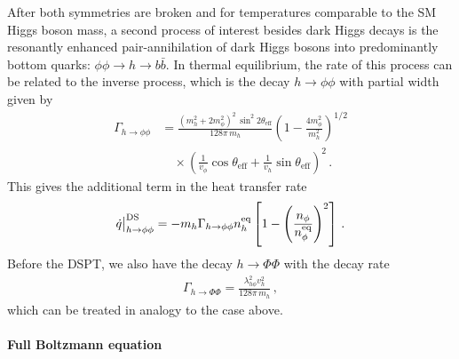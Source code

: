 After both symmetries are broken and for temperatures comparable to the \ac{SM} Higgs boson mass, a second process of interest besides dark Higgs decays is the resonantly enhanced pair-annihilation of dark Higgs bosons into predominantly bottom quarks: $\phi \phi \to h \to b \bar{b}$. In thermal equilibrium, the rate of this process can be related to the inverse process, which is the decay $h \to \phi \phi$ with partial width given by
\begin{align}
	\Gamma_{h\to\phi\phi} &= \frac{(m_h^2 + 2 m_\phi^2)^2 \, \sin^2 2 \theta_{\mathrm{eff}}}{128 \pi \, m_h}
	\left(1 - \frac{4 m_\phi^2}{m_h^2}\right)^{1/2} \nonumber \\ & \quad \times \left(\frac{1}{v_\phi} \cos \theta_{\mathrm{eff}}
	+ \frac{1}{v_h} \sin \theta_{\mathrm{eff}} \right)^2 \,.
\end{align}
This gives the additional term in the heat transfer rate
\begin{align}
	\dot{q}\big|_{h\to\phi\phi}^{\text{DS}} =  - m_{h}\Gamma_{h \to \phi \phi} n^\text{eq}_h
	\left[ 1 - \left(\frac{n_\phi}{n^\text{eq}_\phi}\right)^2 \right]\,.
\end{align}
Before the \ac{DSPT}, we also have the decay $h \rightarrow \Phi\Phi$ with the decay rate
\begin{align}
	\Gamma_{h\to\Phi\Phi} = \frac{\lambda_{h\phi}^2 v_{h}^{2}}{128 \pi \, m_h} \,,
\end{align}
which can be treated in analogy to the case above.

\paragraph{Full Boltzmann equation}

